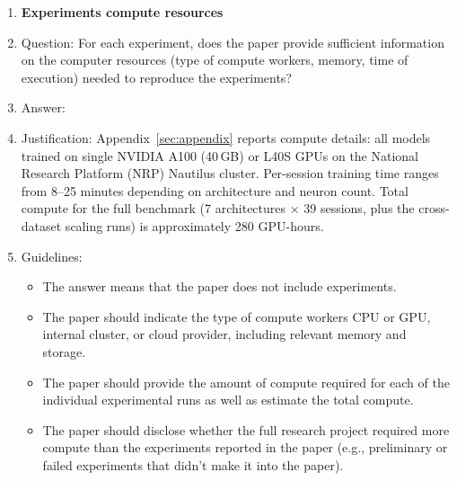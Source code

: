 \begin{enumerate}
\begin{itemize}
        \item It is OK to report 1-sigma error bars, but one should state it. The authors should preferably report a 2-sigma error bar than state that they have a 96\% CI, if the hypothesis of Normality of errors is not verified.
        \item For asymmetric distributions, the authors should be careful not to show in tables or figures symmetric error bars that would yield results that are out of range (e.g., negative error rates).
        \item If error bars are reported in tables or plots, the authors should explain in the text how they were calculated and reference the corresponding figures or tables in the text.
    \end{itemize}

\item {\bf Experiments compute resources}
    \item[] Question: For each experiment, does the paper provide sufficient information on the computer resources (type of compute workers, memory, time of execution) needed to reproduce the experiments?
    \item[] Answer: \answerYes{}
    \item[] Justification: Appendix~\ref{sec:appendix} reports compute details: all
      models trained on single NVIDIA A100 (40\,GB) or L40S GPUs
      on the National Research Platform (NRP) Nautilus cluster.
      Per-session training time ranges from 8--25 minutes depending
      on architecture and neuron count.  Total compute for the
      full benchmark (7 architectures $\times$ 39 sessions,
      plus the cross-dataset scaling runs) is
      approximately 280 GPU-hours.
    \item[] Guidelines:
    \begin{itemize}
        \item The answer \answerNA{} means that the paper does not include experiments.
        \item The paper should indicate the type of compute workers CPU or GPU, internal cluster, or cloud provider, including relevant memory and storage.
        \item The paper should provide the amount of compute required for each of the individual experimental runs as well as estimate the total compute. 
        \item The paper should disclose whether the full research project required more compute than the experiments reported in the paper (e.g., preliminary or failed experiments that didn't make it into the paper). 
    \end{itemize}
    

\end{enumerate}
